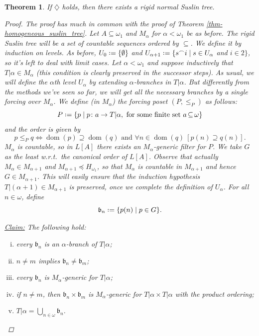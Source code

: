 \documentclass[11pt,a4paper]{report}
\newtheorem{theorem}{Theorem}[chapter] %
\theoremstyle{definition}
\theoremstyle{num.custom-title}
\theoremstyle{custom-title}
\newenvironment{claim}[1]{\par\noindent\underline{Claim#1:}\space}{} %
\DeclareMathOperator{\dom}{dom}
\DeclareMathOperator{\sse}{\subseteq}
\newcommand{\conc}{^\frown}
\newcommand*{\defeq}{\mathrel{\rlap{%
                     \raisebox{0.3ex}{$\cdot$}}%
                     \raisebox{-0.3ex}{$\cdot$}}%
                     =}
\begin{document}
\begin{theorem}
If $\diamondsuit$ holds, then there exists a rigid normal Suslin tree.
\begin{proof}
\renewcommand{\b}{\mathfrak{b}}
The proof has much in common with the proof of Theorem \ref{thm-homogeneous_suslin_tree}. Let $A \sse \omega_1$ and $M_\alpha$ for $\alpha < 	\omega_1$ be as before. The rigid Suslin tree will be a set of countable sequences ordered by $\sse$. We define it by induction on levels. As before, $U_0 \defeq \{\emptyset\}$ and $U_{\alpha+1} \defeq \{s \conc i \mid s \in U_\alpha$ and $i \in 2\}$, so it's left to deal with limit cases. Let $\alpha < \omega_1$ and suppose inductively that $T|\alpha \in M_\alpha$ (this condition is clearly preserved in the successor steps). As usual, we will define the $\alpha$th level $U_\alpha$ by extending $\alpha$-branches in $T|\alpha$. But differently from the methods we've seen so far, we will get \emph{all} the necessary branches by a single forcing over $M_\alpha$. We define (in $M_\alpha$) the forcing poset $(P,\leq_P)$ as follows:
\[
P \defeq \{ p \mid p \colon a \to T|\alpha, \text{ for some finite set $a \sse \omega$} \}
\]
and the order is given by
\[
p \leq_P q \Longleftrightarrow \dom(p) \supseteq \dom(q) \text{ and } \forall n \in \dom(q) \ [p(n) \supseteq q(n)].
\]
$M_\alpha$ is countable, so in $L[A]$ there exists an $M_\alpha$-generic filter for $P$. We take $G$ as the least w.r.t.\ the canonical order of $L[A]$. Observe that actually $M_\alpha \in M_{\alpha+1}$ and $M_{\alpha+1} \preceq H_{\omega_1}$, so that $M_\alpha$ is countable in $M_{\alpha+1}$ and hence $G \in M_{\alpha+1}$. This will easily ensure that the induction hypothesis $T|(\alpha+1) \in M_{\alpha+1}$ is preserved, once we complete the definition of $U_\alpha$. For all $n \in \omega$, define
\[
\b_n \defeq \{p(n) \mid p \in G\}.
\]
\begin{claim}{}
The following hold:
\begin{enumerate}[(i)]
\item every $\b_n$ is an $\alpha$-branch of $T|\alpha$;
\item $n \neq m$ implies $\b_n \neq \b_m$;
\item every $\b_n$ is $M_\alpha$-generic for $T|\alpha$;
\item if $n \neq m$, then $\b_n \times \b_m$ is $M_\alpha$-generic for $T|\alpha \times T|\alpha$ with the product ordering;
\item $T|\alpha = \bigcup_{n \in \omega} \b_n$.
\end{enumerate}

\end{claim}
\end{proof}
\end{theorem}
\end{document}
